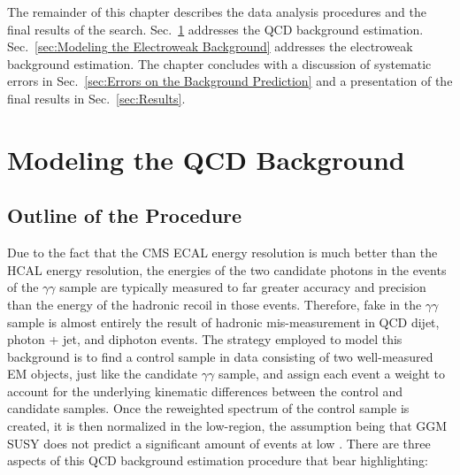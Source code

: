 \documentclass[dissertation.tex]{subfiles}
\begin{document}
The remainder of this chapter describes the data analysis procedures and the final results of the search.  Sec.~\ref{sec:Modeling the QCD Background} addresses the QCD background estimation.  Sec.~\ref{sec:Modeling the Electroweak Background} addresses the electroweak background estimation.  The chapter concludes with a discussion of systematic errors in Sec.~\ref{sec:Errors on the Background Prediction} and a presentation of the final results in Sec.~\ref{sec:Results}.

\section{Modeling the QCD Background}
\label{sec:Modeling the QCD Background}

\subsection{Outline of the Procedure}
\label{sec:Outline of the Procedure}

Due to the fact that the CMS ECAL energy resolution is much better than the HCAL energy resolution, the energies of the two candidate photons in the events of the $\gamma\gamma$ sample are typically measured to far greater accuracy and precision than the energy of the hadronic recoil in those events.  Therefore, fake \MET in the $\gamma\gamma$ sample is almost entirely the result of hadronic mis-measurement in QCD dijet, photon + jet, and diphoton events.  The strategy employed to model this background is to find a control sample in data consisting of two well-measured EM objects, just like the candidate $\gamma\gamma$ sample, and assign each event a weight to account for the underlying kinematic differences between the control and candidate samples.  Once the reweighted \MET spectrum of the control sample is created, it is then normalized in the low-\MET region, the assumption being that GGM SUSY does not predict a significant amount of events at low \MET.  There are three aspects of this QCD background estimation procedure that bear highlighting:
\end{document}

